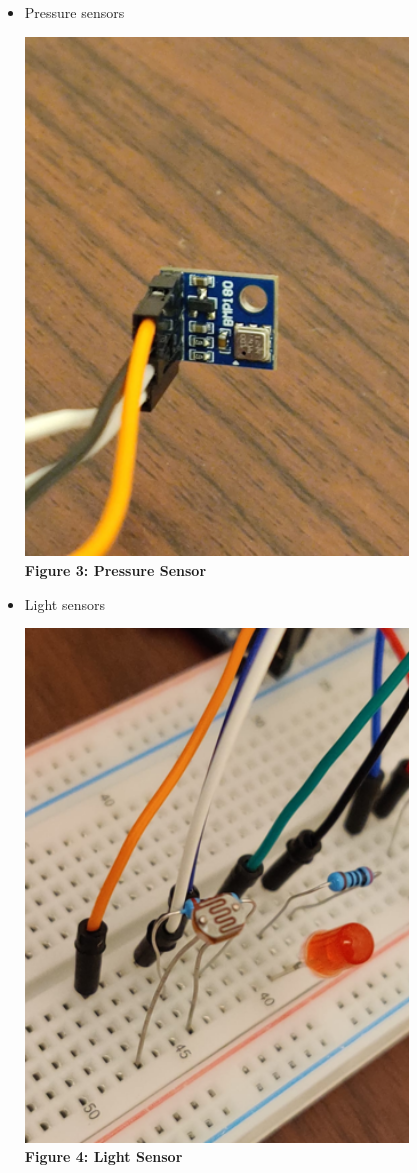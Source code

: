 \documentclass[a4paper,12pt]{article}
\begin{document}
\begin{itemize}
		\item Pressure sensors
		\begin{center}
			\includegraphics[width=0.8\textwidth]{pressure.png}\\
			\textbf{Figure 3: Pressure Sensor}
		\end{center}
		
		\item Light sensors
		\begin{center}
			\includegraphics[width=0.8\textwidth]{light.png}\\
			\textbf{Figure 4: Light Sensor}
		\end{center}
		

\end{itemize}
\end{document}
